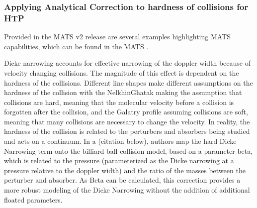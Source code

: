 \documentclass[letterpaper,10pt,english]{sphinxmanual}
\begin{document}
\subsubsection{Applying Analytical Correction to hardness of collisions for HTP}
\label{\detokenize{Applying Analytical Correction to hardness of collisions for HTP:applying-analytical-correction-to-hardness-of-collisions-for-htp}}\label{\detokenize{Applying Analytical Correction to hardness of collisions for HTP::doc}}
\sphinxAtStartPar
Provided in the MATS v2 release are several examples highlighting MATS capabilities, which can be found in the MATS .

\sphinxAtStartPar
Dicke narrowing accounts for effective narrowing of the doppler width because of velocity changing collisions.  The magnitude of this effect is dependent on the hardness of the collisions.  Different line shapes make different assumptions on the hardness of the collision with the Nelkhin\sphinxhyphen{}Ghatak making the assumption that collisions are hard, meaning that the molecular velocity before a collision is forgotten after the collision, and  the Galatry profile assuming collisions are soft, meaning that many collisions are necessary to change the velocity. In reality, the hardness of the collision is related to the perturbers and absorbers being studied and acts on a continuum.  In a  (citation below), authors map the hard Dicke Narrowing term onto the billiard ball collision model, based on a parameter beta, which is related to the pressure (parameterized as the Dicke narrowing at a pressure relative to the doppler width) and the ratio of the masses between the perturber and absorber.  As Beta can be calculated, this correction provides a more robust modeling of the Dicke Narrowing without the addition of additional floated parameters.

\sphinxAtStartPar
{}

\sphinxAtStartPar
{}
\end{document}
